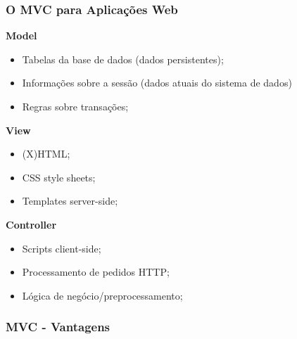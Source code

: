 \documentclass{article}
\begin{document}
\pagebreak

\subsubsection{O MVC para Aplicações Web}

\begin{flushleft}
  \textbf{Model}
  \begin{itemize}
    \item Tabelas da base de dados (dados persistentes);
    \item Informações sobre a sessão (dados atuais do sistema de dados)
    \item Regras sobre transações;
  \end{itemize}

  \textbf{View}
  \begin{itemize}
    \item (X)HTML;
    \item CSS style sheets;
    \item Templates server-side;
  \end{itemize}

  \textbf{Controller}
  \begin{itemize}
    \item Scripts client-side;
    \item Processamento de pedidos HTTP;
    \item Lógica de negócio/preprocessamento;
  \end{itemize}
\end{flushleft}

\subsubsection{MVC - Vantagens}
\end{document}
